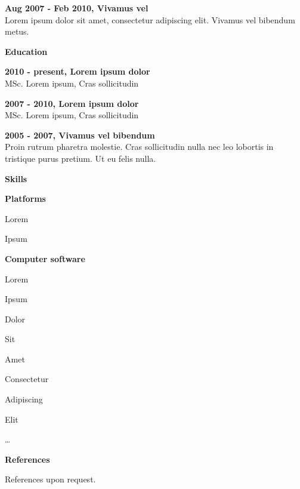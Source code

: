 \documentclass[a4paper,12pt,final]{memoir}
\newcommand{\Sep}{\vspace{1.5em}}
\newcommand{\SmallSep}{\vspace{0.5em}}
\newcommand{\CVSection}[1]
	{\Large\textbf{#1}\par
	\SmallSep\normalsize\normalfont}
\newcommand{\CVItem}[1]
	{\textbf{\color{RoyalBlue} #1}}
\begin{document}
\CVItem{Aug 2007 - Feb 2010, Vivamus vel}\\
Lorem ipsum dolor sit amet, consectetur adipiscing elit. Vivamus vel bibendum metus.
\Sep

\CVSection{Education}
\CVItem{2010 - present, Lorem ipsum dolor}\\
MSc. Lorem ipsum, Cras sollicitudin
\SmallSep

\CVItem{2007 - 2010, Lorem ipsum dolor}\\
MSc. Lorem ipsum, Cras sollicitudin
\SmallSep

\CVItem{2005 - 2007, Vivamus vel bibendum}\\
Proin rutrum pharetra molestie. Cras sollicitudin nulla nec leo lobortis in tristique purus pretium. Ut eu felis nulla.
\Sep

\CVSection{Skills}
\CVItem{Platforms}
\begin{multicols}{3}
\begin{compactitem}[\color{RoyalBlue}$\circ$]
	\item Lorem 
	\item Ipsum 
\end{compactitem}
\end{multicols}
\SmallSep

\CVItem{Computer software}
\begin{multicols}{3}
\begin{compactitem}[\color{RoyalBlue}$\circ$]
	\item Lorem 
	\item Ipsum 
	\item Dolor 
	\item Sit 
	\item Amet
	\item Consectetur 
	\item Adipiscing 
	\item Elit
	\item \ldots
\end{compactitem}
\end{multicols}
\Sep 

\CVSection{References}
References upon request.

\end{document}
